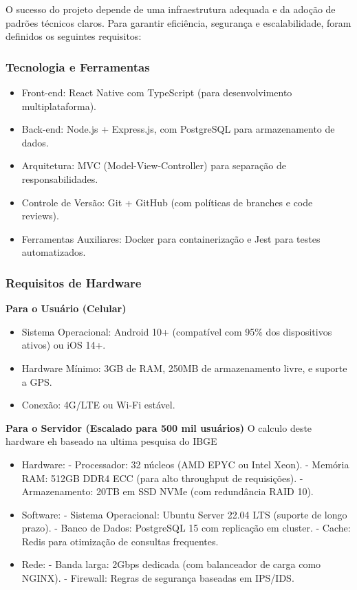\documentclass[a5paper, 12pt]{article}
\begin{document}
O sucesso do projeto depende de uma infraestrutura adequada e da adoção de padrões técnicos claros. Para garantir eficiência, segurança e escalabilidade, foram definidos os seguintes requisitos:

\subsubsection{Tecnologia e Ferramentas}
\begin{itemize}[]
\item Front-end: React Native com TypeScript (para desenvolvimento multiplataforma).
\item Back-end: Node.js + Express.js, com PostgreSQL para armazenamento de dados.
\item Arquitetura: MVC (Model-View-Controller) para separação de responsabilidades.
\item Controle de Versão: Git + GitHub (com políticas de branches e code reviews).
\item Ferramentas Auxiliares: Docker para containerização e Jest para testes automatizados.
\end{itemize}

\subsubsection{Requisitos de Hardware}

\textbf{Para o Usuário (Celular)}
\begin{itemize}[]
\item Sistema Operacional: Android 10+ (compatível com 95\% dos dispositivos ativos) ou iOS 14+.
\item Hardware Mínimo: 3GB de RAM, 250MB de armazenamento livre, e suporte a GPS.
\item Conexão: 4G/LTE ou Wi-Fi estável.
\end{itemize}

\textbf{Para o Servidor (Escalado para 500 mil usuários)}
O calculo deste hardware eh baseado na ultima pesquisa do IBGE \cite{ibge-2022}
\begin{itemize}[]
\item Hardware:
- Processador: 32 núcleos (AMD EPYC ou Intel Xeon).
- Memória RAM: 512GB DDR4 ECC (para alto throughput de requisições).
- Armazenamento: 20TB em SSD NVMe (com redundância RAID 10).
\item Software:
- Sistema Operacional: Ubuntu Server 22.04 LTS (suporte de longo prazo).
- Banco de Dados: PostgreSQL 15 com replicação em cluster.
- Cache: Redis para otimização de consultas frequentes.
\item Rede:
- Banda larga: 2Gbps dedicada (com balanceador de carga como NGINX).
- Firewall: Regras de segurança baseadas em IPS/IDS.
\end{itemize}
\end{document}

